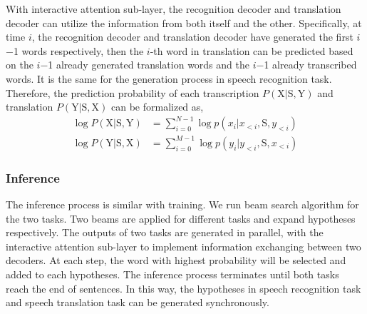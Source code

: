 \documentclass[letterpaper]{article} %
\begin{document}
With interactive attention sub-layer, the recognition decoder and translation decoder can utilize the information from both itself and the other. Specifically, at time $i$, the recognition decoder and translation decoder have generated the first $i$$-$1 words respectively, then the $i$-th word in translation can be predicted based on the $i$$-$1 already generated translation words and the $i$$-$1 already transcribed words. It is the same for the generation process in speech recognition task. Therefore, the prediction probability of each transcription $ P(\mathrm{X}|\mathrm{S},\mathrm{Y})$ and translation $ P(\mathrm{Y}|\mathrm{S},\mathrm{X})$ can be formalized as,
\begin{align}
\log P(\mathrm{X}|\mathrm{S},\mathrm{Y}) &= \sum_{i=0}^{N-1} \log p(x_{i}|x_{<i},\mathrm{S},y_{<i}) \\
\log P(\mathrm{Y}|\mathrm{S},\mathrm{X}) &= \sum_{i=0}^{M-1} \log p(y_{i}|y_{<i},\mathrm{S},x_{<i})
\end{align}

\subsubsection{Inference}
The inference process is similar with training. We run beam search algorithm for the two tasks. Two beams are applied for different tasks and expand hypotheses respectively. The outputs of two tasks are generated in parallel, with the interactive attention sub-layer to implement information exchanging between two decoders. At each step, the word with highest probability will be selected and added to each hypotheses. The inference process terminates until both tasks reach the end of sentences.  In this way, the hypotheses in speech recognition task and speech translation task can be generated synchronously.
\end{document}
